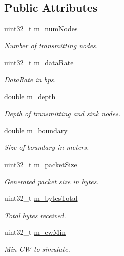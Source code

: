 \subsection*{Public Attributes}
\begin{DoxyCompactItemize}
\item 
uint32\+\_\+t \hyperlink{classExperiment_ac22115998156e9cbf5a2112a1ec9b6bb}{m\+\_\+num\+Nodes}
\begin{DoxyCompactList}\small\item\em Number of transmitting nodes. \end{DoxyCompactList}\item 
uint32\+\_\+t \hyperlink{classExperiment_a5b781fcc8b0242604e4378c1df035228}{m\+\_\+data\+Rate}
\begin{DoxyCompactList}\small\item\em Data\+Rate in bps. \end{DoxyCompactList}\item 
double \hyperlink{classExperiment_a15a89f9eb4b0e8ca6e640208c89126eb}{m\+\_\+depth}
\begin{DoxyCompactList}\small\item\em Depth of transmitting and sink nodes. \end{DoxyCompactList}\item 
double \hyperlink{classExperiment_add5ef2ea8606e6b0f640d46cae90106f}{m\+\_\+boundary}
\begin{DoxyCompactList}\small\item\em Size of boundary in meters. \end{DoxyCompactList}\item 
uint32\+\_\+t \hyperlink{classExperiment_a1562acfc7bc2cbd4c5f995b7c4ef01d0}{m\+\_\+packet\+Size}
\begin{DoxyCompactList}\small\item\em Generated packet size in bytes. \end{DoxyCompactList}\item 
uint32\+\_\+t \hyperlink{classExperiment_a301a75788bd76a56362d21e5ac3b45ca}{m\+\_\+bytes\+Total}
\begin{DoxyCompactList}\small\item\em Total bytes received. \end{DoxyCompactList}\item 
uint32\+\_\+t \hyperlink{classExperiment_a2dbf3ad2a9b3a535c8bb9bb128e47ad3}{m\+\_\+cw\+Min}
\begin{DoxyCompactList}\small\item\em Min CW to simulate. \end{DoxyCompactList}\item 

\end{DoxyCompactItemize}
